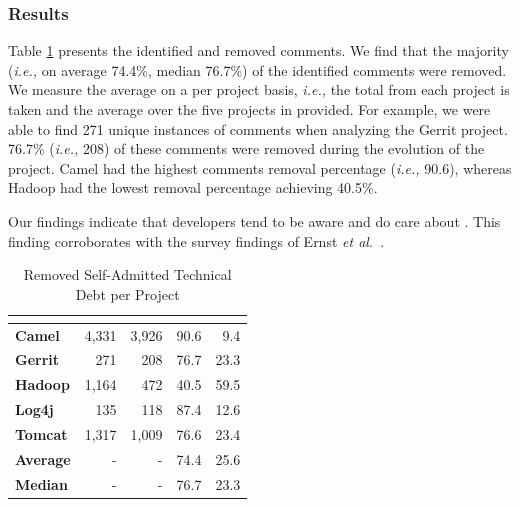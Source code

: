 

\subsubsection*{Results} Table \ref{tbl:removed_self_admitted_technical_debt_per_project} presents the identified and removed \SATD comments. We find that the majority (\textit{i.e.,} on average 74.4\%, median 76.7\%) of the identified \SATD comments were removed. We measure the average on a per project basis, \textit{i.e.,} the total from each project is taken and the average over the five projects in provided. For example, we were able to find 271 unique instances of \SATD comments when analyzing the Gerrit project. 76.7\% (\textit{i.e.,} 208) of these \SATD comments were removed during the evolution of the project. Camel had the highest \SATD comments removal percentage (\textit{i.e.,} 90.6), whereas Hadoop had the lowest removal percentage achieving 40.5\%. 

Our findings indicate that developers tend to be aware and do care about \SATD. This finding corroborates with the survey findings of Ernst \emph{et al.}~\cite{Ernst2015FSE}.

\begin{table}[!t]
	\begin{center}
		\caption{Removed Self-Admitted Technical Debt per Project}
		\label{tbl:removed_self_admitted_technical_debt_per_project}
		\begin{tabular}{l|rrrr}
			\toprule
			\textbf{\thead{Project}} & \textbf{\thead{\#identified}} & \textbf{\thead{\#removed}} & \textbf{\thead{\% removed}} &  \textbf{\thead{\% remains}}  \\ 
			\midrule
			\textbf{Camel }  &  4,331  & 3,926  & 90.6  & 9.4\\
			\textbf{Gerrit}  &  271    & 208    & 76.7 & 23.3 \\
			\textbf{Hadoop}  &  1,164  & 472    & 40.5 & 59.5 \\  
			\textbf{Log4j }  &  135    & 118    & 87.4 & 12.6\\ 
			\textbf{Tomcat}  &  1,317  & 1,009  & 76.6 & 23.4\\   
			\midrule
			\textbf{Average} & -       & -      & 74.4 & 25.6\\
			\textbf{Median} & -       & -      & 76.7 & 23.3\\
			\bottomrule
		\end{tabular}
	\end{center}    
\end{table}

